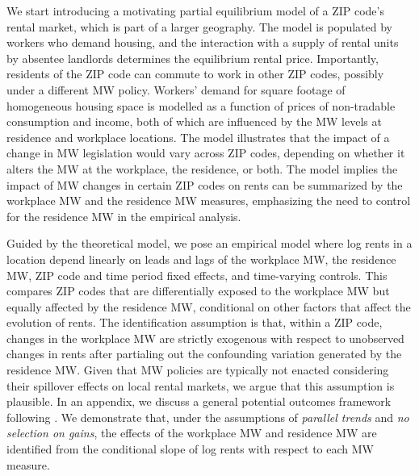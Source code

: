 
We start introducing a motivating partial equilibrium model of a ZIP code's 
rental market, which is part of a larger geography.
The model is populated by workers who demand housing, and the interaction with 
a supply of rental units by absentee landlords determines the equilibrium 
rental price.
Importantly, residents of the ZIP code can commute to work in other ZIP 
codes, possibly under a different MW policy.
Workers' demand for square footage of homogeneous housing space is modelled as 
a function of prices of non-tradable consumption and income, both of which are 
influenced by the MW levels at residence and workplace locations.
The model illustrates that the impact of a change in MW legislation would vary 
across ZIP codes, depending on whether it alters the MW at the workplace,
the residence, or both.
The model implies the impact of MW changes in certain ZIP codes on rents can 
be summarized by the workplace MW and the residence MW measures,
emphasizing the need to control for the residence MW in the empirical analysis.


Guided by the theoretical model, we pose an empirical model where log rents in 
a location depend linearly on
leads and lags of the workplace MW,
the residence MW,
ZIP code and time period fixed effects, and 
time-varying controls.
This compares ZIP codes that are differentially exposed to the workplace MW 
but equally affected by the residence MW, conditional on other factors that 
affect the evolution of rents.
The identification assumption is that, within a ZIP code, 
changes in the workplace MW are strictly exogenous with respect to 
unobserved changes in rents after partialing out the confounding variation 
generated by the residence MW.
Given that MW policies are typically not enacted considering their spillover
effects on local rental markets, we argue that this assumption is plausible.
In an appendix, we discuss a general potential outcomes framework following
\textcite{CallawayEtAl2021}.
We demonstrate that, under the assumptions of \textit{parallel trends} and 
\textit{no selection on gains}, 
the effects of the workplace MW and residence MW are identified from the 
conditional slope of log rents with respect to each MW measure.

